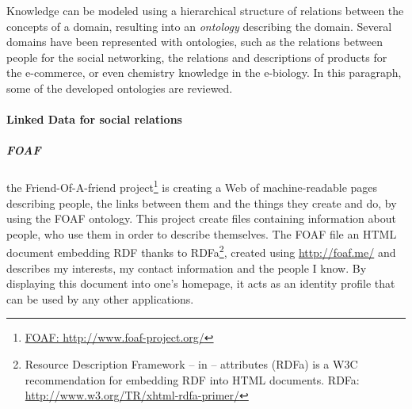 Knowledge can be modeled using a hierarchical structure of relations between the
concepts of a domain, resulting into an \emph{ontology} describing the domain.
Several domains have been represented with ontologies, such as the relations
between people for the social networking, the relations and descriptions of
products for the e-commerce, or even chemistry knowledge in the e-biology. In this
paragraph, some of the developed ontologies are reviewed.

\paragraph{Linked Data for social relations}

\subparagraph{FOAF}

the Friend-Of-A-friend project\footnote{\url{FOAF:
http://www.foaf-project.org/}} is creating a Web of machine-readable pages
describing people, the links between them and the things they create and do,
by using the FOAF ontology. This project create files containing information
about people, who use them in order to describe themselves.
The FOAF file an HTML document embedding RDF thanks to RDFa\footnote{Resource
Description Framework – in – attributes (RDFa) is a W3C recommendation for
embedding RDF into HTML documents. RDFa:
\url{http://www.w3.org/TR/xhtml-rdfa-primer/}}, created using
\url{http://foaf.me/} and describes my interests, my contact information and
the people I know. By displaying this document into one's homepage, it acts as
an identity profile that can be used by any other applications.


